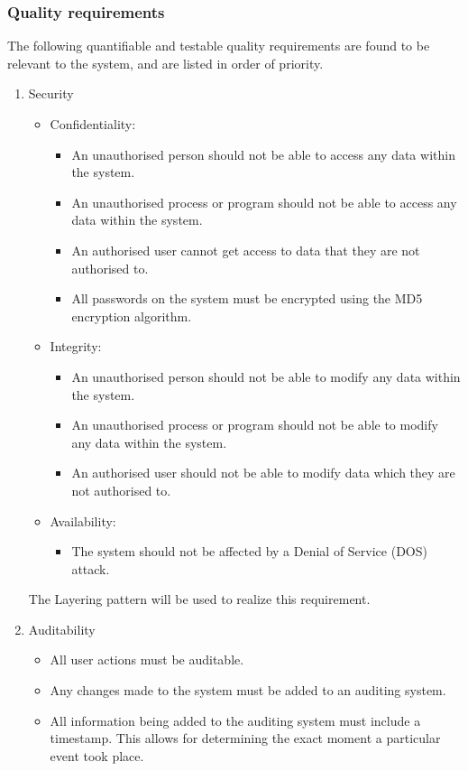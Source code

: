 \documentclass{article}
\begin{document}
	\subsubsection{Quality requirements}
	The following quantifiable and testable quality requirements are found to be relevant to the system, and are listed in order of priority.
	
	\begin{enumerate}
		\item{Security}
		\begin{itemize}
			\item Confidentiality:
			\begin{itemize}
				\item An unauthorised person should not be able to access any data within the system.
				\item An unauthorised process or program should not be able to access any data within the system.
				\item An authorised user cannot get access to data that they are not authorised to.
				\item All passwords on the system must be encrypted using the MD5 encryption algorithm.
			\end{itemize}
			\item Integrity:
			\begin{itemize}
				\item An unauthorised  person should not be able to modify any data within the system.
				\item An unauthorised process or program should not be able to modify any data within the system.
				\item An authorised user should not be able to modify data which they are not authorised to.
			\end{itemize}
			\item Availability:
			\begin{itemize}
				\item The system should not be affected by a Denial of Service (DOS) attack. 	
			\end{itemize}	
		\end{itemize}
		
		The Layering pattern will be used to realize this requirement.
		
		\item{Auditability}
		\begin{itemize}
			\item{All user actions must be auditable.}
			\item{Any changes made to the system must be added to an auditing system.}
			\item{All information being added to the auditing system must include a timestamp. This allows for determining the exact moment a particular event took place.}
		\end{itemize}
		

\end{enumerate}
\end{document}
